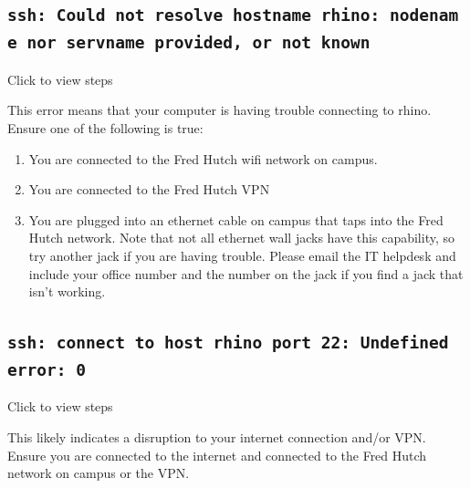 \documentclass[
]{book}
\providecommand{\tightlist}{%
  \setlength{\itemsep}{0pt}\setlength{\parskip}{0pt}}
\begin{document}
\hypertarget{ssh-could-not-resolve-hostname-rhino-nodename-nor-servname-provided-or-not-known}{%
\subsection*{\texorpdfstring{\texttt{ssh:\ Could\ not\ resolve\ hostname\ rhino:\ nodename\ nor\ servname\ provided,\ or\ not\ known}}{ssh: Could not resolve hostname rhino: nodename nor servname provided, or not known}}\label{ssh-could-not-resolve-hostname-rhino-nodename-nor-servname-provided-or-not-known}}

Click to view steps

This error means that your computer is having trouble connecting to rhino. Ensure one of the following is true:

\begin{enumerate}
\def\labelenumi{\arabic{enumi}.}
\tightlist
\item
  You are connected to the Fred Hutch wifi network on campus.
\item
  You are connected to the Fred Hutch VPN
\item
  You are plugged into an ethernet cable on campus that taps into the Fred Hutch network. Note that not all ethernet wall jacks have this capability, so try another jack if you are having trouble. Please email the IT helpdesk and include your office number and the number on the jack if you find a jack that isn't working.
\end{enumerate}

\hypertarget{ssh-connect-to-host-rhino-port-22-undefined-error-0}{%
\subsection*{\texorpdfstring{\texttt{ssh:\ connect\ to\ host\ rhino\ port\ 22:\ Undefined\ error:\ 0}}{ssh: connect to host rhino port 22: Undefined error: 0}}\label{ssh-connect-to-host-rhino-port-22-undefined-error-0}}

Click to view steps

This likely indicates a disruption to your internet connection and/or VPN. Ensure you are connected to the internet and connected to the Fred Hutch network on campus or the VPN.
\end{document}
